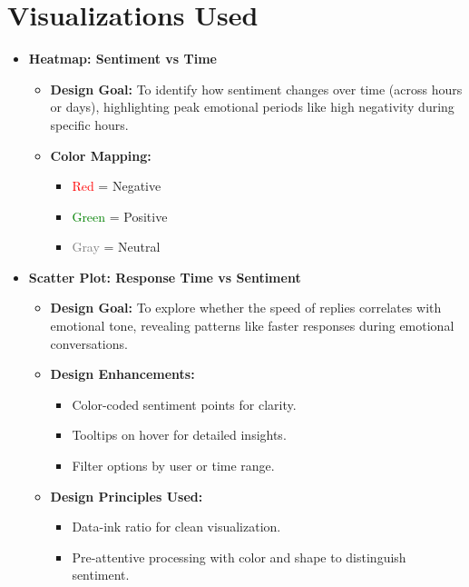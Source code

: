 \documentclass{article}\usepackage{graphicx}
\begin{document}
 \section*{Visualizations Used}

\begin{itemize}
    \item \textbf{Heatmap: Sentiment vs Time}
    \begin{itemize}
        \item \textbf{Design Goal:} To identify how sentiment changes over time (across hours or days), highlighting peak emotional periods like high negativity during specific hours.
        \item \textbf{Color Mapping:}
        \begin{itemize}
            \item \textcolor{red}{Red} = Negative
            \item \textcolor{green}{Green} = Positive
            \item \textcolor{gray}{Gray} = Neutral
        \end{itemize}
    \end{itemize}
    
    \item \textbf{Scatter Plot: Response Time vs Sentiment}
    \begin{itemize}
        \item \textbf{Design Goal:} To explore whether the speed of replies correlates with emotional tone, revealing patterns like faster responses during emotional conversations.
        \item \textbf{Design Enhancements:}
        \begin{itemize}
            \item Color-coded sentiment points for clarity.
            \item Tooltips on hover for detailed insights.
            \item Filter options by user or time range.
        \end{itemize}
        \item \textbf{Design Principles Used:}
        \begin{itemize}
            \item Data-ink ratio for clean visualization.
            \item Pre-attentive processing with color and shape to distinguish sentiment.
        \end{itemize}
    \end{itemize}
    

\end{itemize}
\end{document}
